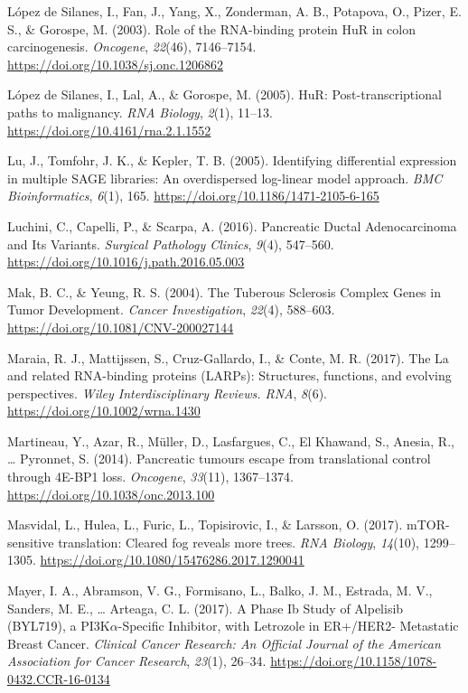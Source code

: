 \documentclass[12pt,openany]{book}
\begin{document}
\hypertarget{ref-LopezdeSilanes2003}{}
López de Silanes, I., Fan, J., Yang, X., Zonderman, A. B., Potapova, O.,
Pizer, E. S., \& Gorospe, M. (2003). Role of the RNA-binding protein HuR
in colon carcinogenesis. \emph{Oncogene}, \emph{22}(46), 7146--7154.
\url{https://doi.org/10.1038/sj.onc.1206862}

\hypertarget{ref-LopezdeSilanes2005}{}
López de Silanes, I., Lal, A., \& Gorospe, M. (2005). HuR:
Post-transcriptional paths to malignancy. \emph{RNA Biology},
\emph{2}(1), 11--13. \url{https://doi.org/10.4161/rna.2.1.1552}

\hypertarget{ref-Lu2005}{}
Lu, J., Tomfohr, J. K., \& Kepler, T. B. (2005). Identifying
differential expression in multiple SAGE libraries: An overdispersed
log-linear model approach. \emph{BMC Bioinformatics}, \emph{6}(1), 165.
\url{https://doi.org/10.1186/1471-2105-6-165}

\hypertarget{ref-Luchini2016}{}
Luchini, C., Capelli, P., \& Scarpa, A. (2016). Pancreatic Ductal
Adenocarcinoma and Its Variants. \emph{Surgical Pathology Clinics},
\emph{9}(4), 547--560. \url{https://doi.org/10.1016/j.path.2016.05.003}

\hypertarget{ref-Mak2004}{}
Mak, B. C., \& Yeung, R. S. (2004). The Tuberous Sclerosis Complex Genes
in Tumor Development. \emph{Cancer Investigation}, \emph{22}(4),
588--603. \url{https://doi.org/10.1081/CNV-200027144}

\hypertarget{ref-Maraia2017}{}
Maraia, R. J., Mattijssen, S., Cruz-Gallardo, I., \& Conte, M. R.
(2017). The La and related RNA-binding proteins (LARPs): Structures,
functions, and evolving perspectives. \emph{Wiley Interdisciplinary
Reviews. RNA}, \emph{8}(6). \url{https://doi.org/10.1002/wrna.1430}

\hypertarget{ref-Martineau2014}{}
Martineau, Y., Azar, R., Müller, D., Lasfargues, C., El Khawand, S.,
Anesia, R., \ldots{} Pyronnet, S. (2014). Pancreatic tumours escape from
translational control through 4E-BP1 loss. \emph{Oncogene},
\emph{33}(11), 1367--1374. \url{https://doi.org/10.1038/onc.2013.100}

\hypertarget{ref-Masvidal2017}{}
Masvidal, L., Hulea, L., Furic, L., Topisirovic, I., \& Larsson, O.
(2017). mTOR-sensitive translation: Cleared fog reveals more trees.
\emph{RNA Biology}, \emph{14}(10), 1299--1305.
\url{https://doi.org/10.1080/15476286.2017.1290041}

\hypertarget{ref-Mayer2017}{}
Mayer, I. A., Abramson, V. G., Formisano, L., Balko, J. M., Estrada, M.
V., Sanders, M. E., \ldots{} Arteaga, C. L. (2017). A Phase Ib Study of
Alpelisib (BYL719), a PI3K\(\alpha\)-Specific Inhibitor, with Letrozole
in ER+/HER2- Metastatic Breast Cancer. \emph{Clinical Cancer Research:
An Official Journal of the American Association for Cancer Research},
\emph{23}(1), 26--34.
\url{https://doi.org/10.1158/1078-0432.CCR-16-0134}
\end{document}

